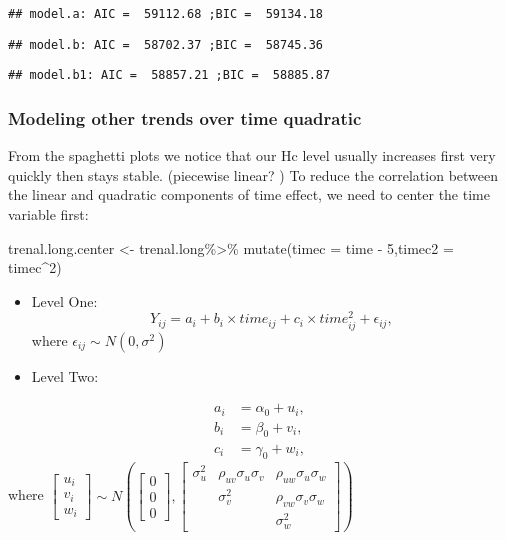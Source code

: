 \documentclass[
]{article}
\newenvironment{Shaded}{\begin{snugshade}}{\end{snugshade}}
\newcommand{\AttributeTok}[1]{\textcolor[rgb]{0.77,0.63,0.00}{#1}}
\newcommand{\DecValTok}[1]{\textcolor[rgb]{0.00,0.00,0.81}{#1}}
\newcommand{\FunctionTok}[1]{\textcolor[rgb]{0.00,0.00,0.00}{#1}}
\newcommand{\NormalTok}[1]{#1}
\newcommand{\OtherTok}[1]{\textcolor[rgb]{0.56,0.35,0.01}{#1}}
\newcommand{\SpecialCharTok}[1]{\textcolor[rgb]{0.00,0.00,0.00}{#1}}
\begin{document}
\begin{verbatim}
## model.a: AIC =  59112.68 ;BIC =  59134.18
\end{verbatim}

\begin{verbatim}
## model.b: AIC =  58702.37 ;BIC =  58745.36
\end{verbatim}

\begin{verbatim}
## model.b1: AIC =  58857.21 ;BIC =  58885.87
\end{verbatim}

\hypertarget{modeling-other-trends-over-time-quadratic}{%
\subsubsection{Modeling other trends over time
quadratic}\label{modeling-other-trends-over-time-quadratic}}

From the spaghetti plots we notice that our Hc level usually increases
first very quickly then stays stable. (piecewise linear? ) To reduce the
correlation between the linear and quadratic components of time effect,
we need to center the time variable first:

\begin{Shaded}
\begin{Highlighting}[]
\NormalTok{trenal.long.center }\OtherTok{\textless{}{-}}\NormalTok{ trenal.long}\SpecialCharTok{\%\textgreater{}\%}
  \FunctionTok{mutate}\NormalTok{(}\AttributeTok{timec =}\NormalTok{ time }\SpecialCharTok{{-}} \DecValTok{5}\NormalTok{,}\AttributeTok{timec2 =}\NormalTok{ timec}\SpecialCharTok{\^{}}\DecValTok{2}\NormalTok{)}
\end{Highlighting}
\end{Shaded}

\begin{itemize}
\item
  Level One:
  \[Y_{ij} = a_i + b_i \times time_{ij} + c_i \times time_{ij}^2 + \epsilon_{ij},\]
  where \(\epsilon_{ij} \sim N(0,\sigma^2)\)
\item
  Level Two:
\end{itemize}

\begin{align}
  a_i &= \alpha_0 + u_i, \\
  b_i &= \beta_0 + v_i, \\
  c_i &= \gamma_0 + w_i,
  \end{align} where
\(\begin{bmatrix} u_i \\ v_i \\w_i \end{bmatrix} \sim N\left(\begin{bmatrix} 0 \\ 0 \\0 \end{bmatrix}, \begin{bmatrix}\sigma_{u}^2 & \rho_{uv}\sigma_u\sigma_v & \rho_{uw} \sigma_u \sigma_w \\ & \sigma_v^2 & \rho_{vw} \sigma_v\sigma_w \\ & & \sigma_w^2 \end{bmatrix}\right)\)
\end{document}
